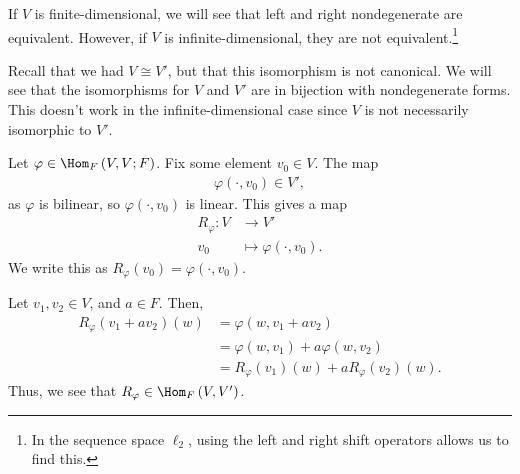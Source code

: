 \documentclass[10pt]{mypackage}
\begin{document}
  If $V$ is finite-dimensional, we will see that left and right nondegenerate are equivalent. However, if $V$ is infinite-dimensional, they are not equivalent.\footnote{In the sequence space $\ell_2$, using the left and right shift operators allows us to find this.}\newline

  Recall that we had $V\cong V'$, but that this isomorphism is not canonical. We will see that the isomorphisms for $V$ and $V'$ are in bijection with nondegenerate forms. This doesn't work in the infinite-dimensional case since $V$ is not necessarily isomorphic to $V'$.\newline

  Let $\varphi\in \Hom_{F}\left(V,V;F\right)$. Fix some element $v_0\in V$. The map
  \begin{align*}
    \varphi\left(\cdot,v_0\right)\in V',
  \end{align*}
  as $\varphi$ is bilinear, so $\varphi\left(\cdot,v_0\right)$ is linear. This gives a map
  \begin{align*}
    R_{\varphi}: V &\rightarrow V'\\
    v_0 &\mapsto \varphi\left(\cdot,v_0\right).
  \end{align*}
  We write this as $R_{\varphi}\left(v_0\right) = \varphi\left(\cdot,v_0\right)$.\newline

  Let $v_1,v_2\in V$, and $a\in F$. Then,
  \begin{align*}
    R_{\varphi}\left(v_1 + av_2\right)\left(w\right) &= \varphi\left(w,v_1 + av_2\right)\\
                                                     &= \varphi\left(w,v_1\right) + a\varphi\left(w,v_2\right)\\
                                                     &= R_{\varphi}\left(v_1\right)\left(w\right) + aR_{\varphi}\left(v_2\right)\left(w\right).
  \end{align*}
  Thus, we see that $R_{\varphi}\in \Hom_{F}\left(V,V'\right)$.\newline
\end{document}
